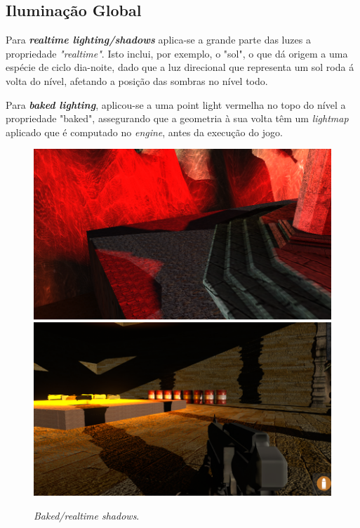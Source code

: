 \documentclass{article}
\begin{document}
        \subsection*{Iluminação Global}
        \par
        Para \textbf{\textit{realtime lighting/shadows}} aplica-se a grande parte das luzes a propriedade \textit{"realtime"}. Isto inclui, por exemplo, o "sol", o que dá origem a uma espécie de ciclo dia-noite, dado que a luz direcional que representa um sol roda á volta do nível, afetando a posição das sombras no nível todo.
        \par
        Para \textbf{\textit{baked lighting}}, aplicou-se a uma point light vermelha no topo do nível a propriedade "baked", assegurando que a geometria à sua volta têm um \textit{lightmap} aplicado que é computado no \textit{engine}, antes da execução do jogo.
        \begin{figure}[h]\begin{center}
            \includegraphics[scale=0.25]{Screenshot_9.png}
            \includegraphics[scale=0.24]{Screenshot_14.png}
            \caption{\textit{Baked/realtime shadows}.}
        \end{center}\end{figure}
\end{document}
